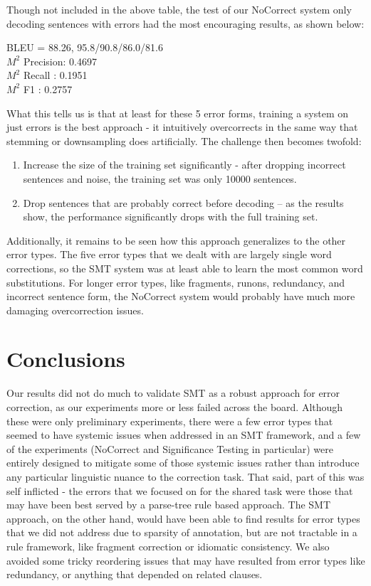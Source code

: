\documentclass[11pt,letterpaper]{article}
\begin{document}
Though not included in the above table, the test of our NoCorrect system only decoding sentences with errors had the most encouraging results, as shown below:

\begin{framed}
BLEU = 88.26, 95.8/90.8/86.0/81.6 \\
$M^2$ Precision: 0.4697 \\
$M^2$ Recall   : 0.1951 \\
$M^2$ F1       : 0.2757 \\
\end{framed}

What this tells us is that at least for these 5 error forms, training a system on just errors is the best approach - it intuitively overcorrects in the same way that stemming or downsampling does artificially. The challenge then becomes twofold:
\begin{enumerate}
  \item Increase the size of the training set significantly - after dropping incorrect sentences and noise, the training set was only 10000 sentences.
  \item Drop sentences that are probably correct before decoding -- as the results show, the performance significantly drops with the full training set.
\end{enumerate}

Additionally, it remains to be seen how this approach generalizes to the other error types. The five error types that we dealt with are largely single word corrections, so the SMT system was at least able to learn the most common word substitutions. For longer error types, like fragments, runons, redundancy, and incorrect sentence form, the NoCorrect system would probably have much more damaging overcorrection issues.

\section{Conclusions}

Our results did not do much to validate SMT as a robust approach for error correction, as our experiments more or less failed across the board. Although these were only preliminary experiments, there were a few error types that seemed to have systemic issues when addressed in an SMT framework, and a few of the experiments (NoCorrect and Significance Testing in particular) were entirely designed to mitigate some of those systemic issues rather than introduce any particular linguistic nuance to the correction task. That said, part of this was self inflicted - the errors that we focused on for the shared task were those that may have been best served by a parse-tree rule based approach. The SMT approach, on the other hand, would have been able to find results for error types that we did not address due to sparsity of annotation, but are not tractable in a rule framework, like fragment correction or idiomatic consistency. We also avoided some tricky reordering issues that may have resulted from error types like redundancy, or anything that depended on related clauses. 
\end{document}
